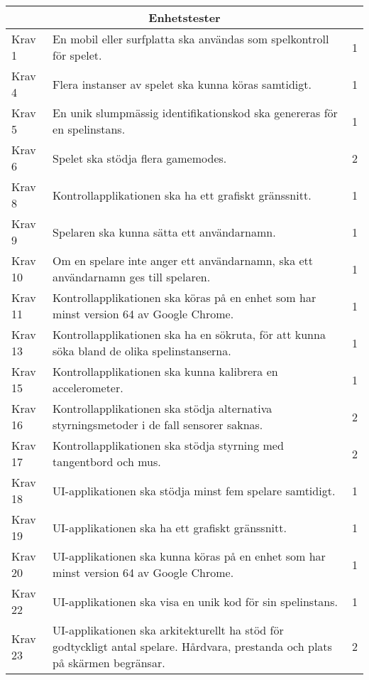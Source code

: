 \documentclass[10pt]{article}
\begin{document}
  \begin{tabular}{| p{2cm} | p{8cm} | p{2cm}|}
	
  \hline
    \multicolumn{3}{|c|}{Enhetstester}\\
    \hline
    
		Krav 1&En mobil eller surfplatta ska användas som spelkontroll för spelet.&1\\
		\hline
		Krav 4& Flera instanser av spelet ska kunna köras samtidigt. & 1 \\
		\hline
		Krav 5& En unik slumpmässig identifikationskod ska genereras för en spelinstans. &  1 \\
		\hline
		Krav 6& Spelet ska stödja flera gamemodes. & 2 \\
		\hline
		Krav 8& Kontrollapplikationen ska ha ett grafiskt gränssnitt. & 1 \\
		\hline
		Krav 9& Spelaren ska kunna sätta ett användarnamn. & 1 \\
		\hline
		Krav 10& Om en spelare inte anger ett användarnamn, ska ett användarnamn ges till spelaren. & 1 \\
		\hline
		Krav 11& Kontrollapplikationen ska köras på en enhet som har minst version 64 av Google Chrome. & 1 \\
		\hline
		Krav 13& Kontrollapplikationen ska ha en sökruta, för att kunna söka bland de olika spelinstanserna. & 1 \\
		\hline
		Krav 15& Kontrollapplikationen ska kunna kalibrera en accelerometer. & 1 \\
		\hline
		Krav 16& Kontrollapplikationen ska stödja alternativa styrningsmetoder i de fall sensorer saknas. & 2 \\
		\hline
		Krav 17& Kontrollapplikationen ska stödja styrning med tangentbord och mus. & 2 \\
		\hline
		Krav 18& UI-applikationen ska stödja minst fem spelare samtidigt. & 1 \\
		\hline
		Krav 19& UI-applikationen ska ha ett grafiskt gränssnitt. & 1 \\
		\hline
		Krav 20& UI-applikationen ska kunna köras på en enhet som har minst version 64 av Google Chrome. & 1 \\
		\hline
		Krav 22& UI-applikationen ska visa en unik kod för sin spelinstans. & 1 \\
		\hline
		Krav 23& UI-applikationen ska arkitekturellt ha stöd för godtyckligt antal spelare. Hårdvara, prestanda och plats på skärmen begränsar. & 2 \\
		\hline


   
  \end{tabular}
  
\end{document}
